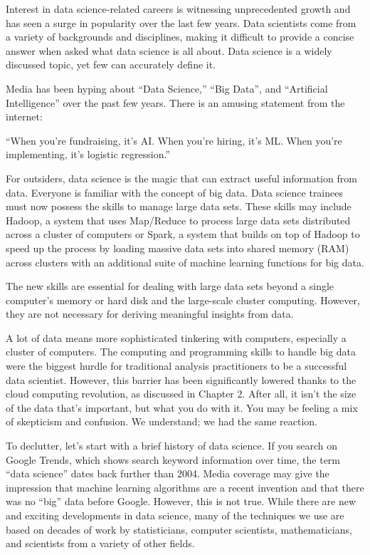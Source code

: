 \documentclass[
  12pt,
]{krantz}
\renewenvironment{quote}{\begin{VF}}{\end{VF}}
\begin{document}
Interest in data science-related careers is witnessing unprecedented growth and has seen a surge in popularity over the last few years. Data scientists come from a variety of backgrounds and disciplines, making it difficult to provide a concise answer when asked what data science is all about. Data science is a widely discussed topic, yet few can accurately define it.

Media has been hyping about ``Data Science,'' ``Big Data'', and ``Artificial Intelligence'' over the past few years. There is an amusing statement from the internet:

\begin{quote}
``When you're fundraising, it's AI. When you're hiring, it's ML. When you're implementing, it's logistic regression.''
\end{quote}

For outsiders, data science is the magic that can extract useful information from data. Everyone is familiar with the concept of big data. Data science trainees must now possess the skills to manage large data sets. These skills may include Hadoop, a system that uses Map/Reduce to process large data sets distributed across a cluster of computers or Spark, a system that builds on top of Hadoop to speed up the process by loading massive data sets into shared memory (RAM) across clusters with an additional suite of machine learning functions for big data.

The new skills are essential for dealing with large data sets beyond a single computer's memory or hard disk and the large-scale cluster computing. However, they are not necessary for deriving meaningful insights from data.

A lot of data means more sophisticated tinkering with computers, especially a cluster of computers. The computing and programming skills to handle big data were the biggest hurdle for traditional analysis practitioners to be a successful data scientist. However, this barrier has been significantly lowered thanks to the cloud computing revolution, as discussed in Chapter 2. After all, it isn't the size of the data that's important, but what you do with it. You may be feeling a mix of skepticism and confusion. We understand; we had the same reaction.

To declutter, let's start with a brief history of data science. If you search on Google Trends, which shows search keyword information over time, the term ``data science'' dates back further than 2004. Media coverage may give the impression that machine learning algorithms are a recent invention and that there was no ``big'' data before Google. However, this is not true. While there are new and exciting developments in data science, many of the techniques we use are based on decades of work by statisticians, computer scientists, mathematicians, and scientists from a variety of other fields.
\end{document}
